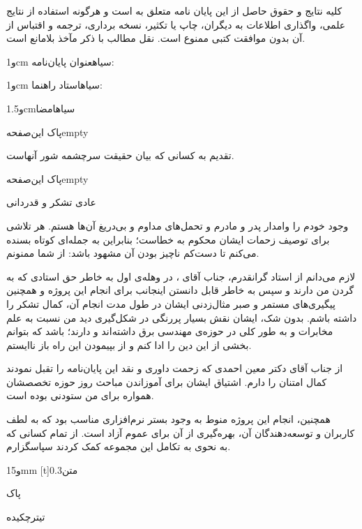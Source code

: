 کلیه نتایج و حقوق حاصل از این پايان نامه متعلق به \instfa است و هرگونه استفاده از نتایج علمی، واگذاری اطلاعات به دیگران، چاپ یا تکثیر، نسخه برداری، ترجمه و اقتباس از آن بدون موافقت کتبی \instfa ممنوع است. نقل مطالب با ذکر مآخذ بلامانع است.

‌و{1cm}
‌سیاه{عنوان پایان‌نامه}: \titlefa

‌و{1cm}
‌سیاه{استاد راهنما}:
\supervisorfa
{}


‌و{1.5cm}\authorfa{}‌سیاه{امضا}

‌پاک
‌این‌صفحه{empty}

 تقدیم به کسانی که بیان حقیقت سرچشمه شور آنهاست.

‌پاک
‌این‌صفحه{empty}

‌عادی تشکر و قدردانی


وجود خودم را وامدار پدر و مادرم و تحمل‌های مداوم و بی‌دریغ آن‌ها هستم. هر تلاشی برای توصیف زحمات ایشان محکوم به خطاست؛ بنابراین به جمله‌ای کوتاه بسنده می‌کنم تا دست‌کم ناچیز بودن آن مشهود باشد: از شما ممنونم.

لازم می‌دانم از استاد گرانقدرم، جناب آقای \supervisorfa، در وهله‌ی اول به خاطر حق استادی که به گردن من دارند و سپس به خاطر قابل دانستن اینجانب برای انجام این پروژه و همچنین پیگیری‌های مستمر و صبر مثال‌زدنی ایشان در طول مدت انجام آن، کمال تشکر را داشته باشم. بدون شک، ایشان نقش بسیار پررنگی در شکل‌گیری دید من نسبت به علم مخابرات و به طور کلی در حوزه‌ی مهندسی برق داشته‌اند و دارند؛ باشد که بتوانم بخشی از این دین را ادا کنم و از بپیمودن این راه باز ناایستم.

از جناب آقای دکتر معین احمدی که زحمت داوری و نقد این پایان‌نامه را تقبل نمودند کمال امتنان را دارم. اشتیاق ایشان برای آموزاندن مباحث روز حوزه تخصصشان همواره برای من ستودنی بوده است.

همچنین، انجام این پروژه منوط به وجود بستر نرم‌افزاری مناسب بود که به لطف کاربران و توسعه‌دهندگان آن، بهره‌گیری از آن برای عموم آزاد است. از تمام کسانی که به نحوی به تکامل این مجموعه کمک کردند سپاسگزارم.

‌و{15mm}
[t]{0.3‌متن}
\authorfa\par\datefa
{}

‌پاک

‌تیتر{چکیده}

